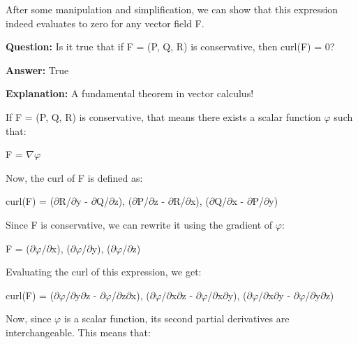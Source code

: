 \documentclass{article}
\begin{document}
After some manipulation and simplification, we can show that this expression indeed evaluates to zero for any vector field F.
                
                \vspace{0.5cm} 
        
            
                \textbf {Question:} Is it true that if F = (P, Q, R) is conservative, then curl(F) = 0?
                
                \textbf{Answer:} True

                \textbf{Explanation:} A fundamental theorem in vector calculus!

If F = (P, Q, R) is conservative, that means there exists a scalar function \ensuremath{\varphi} such that:

F = \ensuremath{\nabla}\ensuremath{\varphi}

Now, the curl of F is defined as:

curl(F) = (\ensuremath{\partial}R/\ensuremath{\partial}y - \ensuremath{\partial}Q/\ensuremath{\partial}z), (\ensuremath{\partial}P/\ensuremath{\partial}z - \ensuremath{\partial}R/\ensuremath{\partial}x), (\ensuremath{\partial}Q/\ensuremath{\partial}x - \ensuremath{\partial}P/\ensuremath{\partial}y)

Since F is conservative, we can rewrite it using the gradient of \ensuremath{\varphi}:

F = (\ensuremath{\partial}\ensuremath{\varphi}/\ensuremath{\partial}x), (\ensuremath{\partial}\ensuremath{\varphi}/\ensuremath{\partial}y), (\ensuremath{\partial}\ensuremath{\varphi}/\ensuremath{\partial}z)

Evaluating the curl of this expression, we get:

curl(F) = (\ensuremath{\partial}{\texttwosuperior}\ensuremath{\varphi}/\ensuremath{\partial}y\ensuremath{\partial}z - \ensuremath{\partial}{\texttwosuperior}\ensuremath{\varphi}/\ensuremath{\partial}z\ensuremath{\partial}x), (\ensuremath{\partial}{\texttwosuperior}\ensuremath{\varphi}/\ensuremath{\partial}x\ensuremath{\partial}z - \ensuremath{\partial}{\texttwosuperior}\ensuremath{\varphi}/\ensuremath{\partial}x\ensuremath{\partial}y), (\ensuremath{\partial}{\texttwosuperior}\ensuremath{\varphi}/\ensuremath{\partial}x\ensuremath{\partial}y - \ensuremath{\partial}{\texttwosuperior}\ensuremath{\varphi}/\ensuremath{\partial}y\ensuremath{\partial}z)

Now, since \ensuremath{\varphi} is a scalar function, its second partial derivatives are interchangeable. This means that:
\end{document}
